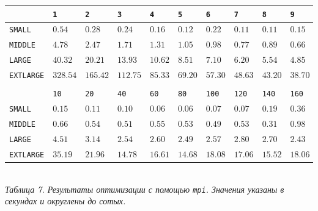 \documentclass[a4paper, 11pt]{article}
\begin{document}
\begin{center}
    \begin{tabular}{l | l l l l l l l l l}
        & \texttt{1} & \texttt{2} & \texttt{3} & \texttt{4} & \texttt{5} & \texttt{6} & \texttt{7} & \texttt{8} & \texttt{9} \\
        \hline
        \texttt{SMALL}    & $0.54$ & $0.28$ & $0.24$ & $0.16$ & $0.12$ & $0.22$ & $0.11$ & $0.11$ & $0.15$ \\
        \texttt{MIDDLE}   & $4.78$ & $2.47$ & $1.71$ & $1.31$ & $1.05$ & $0.98$ & $0.77$ & $0.89$ & $0.66$ \\
        \texttt{LARGE}    & $40.32$ & $20.21$ & $13.93$ & $10.62$ & $8.51$ & $7.10$ & $6.20$ & $5.54$ & $4.85$ \\
        \texttt{EXTLARGE} & $328.54$ & $165.42$ & $112.75$ & $85.33$ & $69.20$ & $57.30$ & $48.63$ & $43.20$ & $38.70$ \\
        \vspace{0.4cm}\\
        & \texttt{10} & \texttt{20} & \texttt{40} & \texttt{60} & \texttt{80} & \texttt{100} & \texttt{120} & \texttt{140} & \texttt{160} \\
        \hline
        \texttt{SMALL}    & $0.15$ & $0.11$ & $0.10$ & $0.06$ & $0.06$ & $0.07$ & $0.07$ & $0.19$ & $0.36$ \\
        \texttt{MIDDLE}   & $0.66$ & $0.54$ & $0.51$ & $0.55$ & $0.53$ & $0.49$ & $0.53$ & $0.31$ & $0.98$ \\
        \texttt{LARGE}    & $4.51$ & $3.14$ & $2.54$ & $2.60$ & $2.49$ & $2.57$ & $2.80$ & $2.70$ & $2.43$ \\
        \texttt{EXTLARGE} & $35.19$ & $21.96$ & $14.78$ & $16.61$ & $14.68$ & $18.08$ & $17.06$ & $15.52$ & $18.06$ \\
    \end{tabular}\\
    \vspace{0.3cm}
    \small \it
    Таблица 7.  Результаты оптимизации с помощью \texttt{mpi}. Значения указаны в секундах и округлены до сотых.
\end{center}
\newpage
\end{document}
